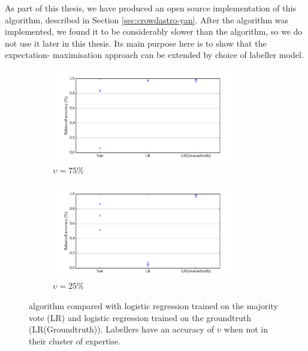         As part of this thesis, we have produced an open source implementation
        of this algorithm, described in Section \ref{sec:crowdastro-yan}. After
        the algorithm was implemented, we found it to be considerably slower
        than the \citeauthor{raykar10} algorithm, so we do not use it later in
        this thesis. Its main purpose here is to show that the expectation-
        maximisation approach can be extended by choice of labeller model.

        \begin{figure}[!ht]
            \centering
            \begin{subfigure}{\textwidth}
                \centering
                \includegraphics[width=0.9\textwidth]
                    {images/experiments/yan_25pc_noise.pdf}
                \caption{$\upsilon = 75\%$}
                \label{fig:yan-experiment-low-noise}
            \end{subfigure}
            \begin{subfigure}{\textwidth}
                \centering
                \includegraphics[width=0.9\textwidth]
                    {images/experiments/yan_75pc_noise.pdf}
                \caption{$\upsilon = 25\%$}
                \label{fig:yan-experiment-high-noise}
            \end{subfigure}
            \caption{\citeauthor{yan10} algorithm compared with logistic
                regression trained on the majority vote (LR) and logistic
                regression trained on the groundtruth (LR(Groundtruth)).
                Labellers have an accuracy of $\upsilon$ when not in
                their cluster of expertise.}
        \end{figure}

